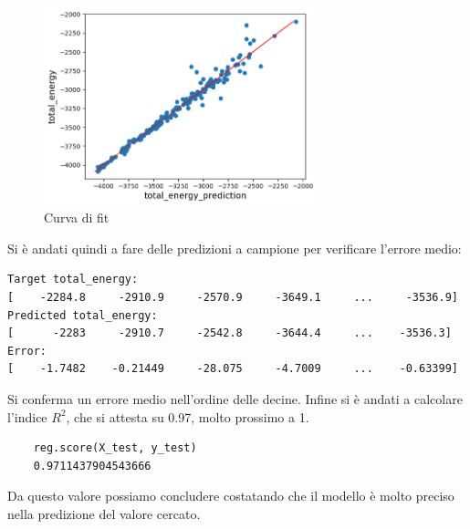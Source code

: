 \documentclass[12pt,a4paper,openright,twoside]{report}
\begin{document}
\begin{center}
\begin{figure}[h]
\centering
\includegraphics[width=300px,keepaspectratio]{fit.png}
\caption{Curva di fit}
\end{figure}    
\end{center} 

Si è andati quindi a fare delle predizioni a campione per verificare l'errore medio: 
\begin{verbatim}
Target total_energy: 
[    -2284.8     -2910.9     -2570.9     -3649.1     ...     -3536.9]
Predicted total_energy: 
[      -2283     -2910.7     -2542.8     -3644.4     ...    -3536.3]
Error: 
[    -1.7482    -0.21449     -28.075     -4.7009     ...    -0.63399]
\end{verbatim}

Si conferma un errore medio nell’ordine delle decine. 
\newpage
Infine si è andati a calcolare l'indice $R^2$, che si attesta su 0.97, molto prossimo a 1.  
\begin{verbatim}
    reg.score(X_test, y_test)
    0.9711437904543666
\end{verbatim}
Da questo valore possiamo concludere costatando che il modello è molto preciso nella predizione del valore cercato.
\end{document}
